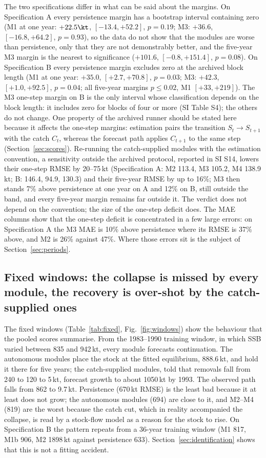 The two specifications differ in what can be said about the margins. On Specification A every persistence margin has a bootstrap interval containing zero (M1 at one year: $+22.5\kt$, $[-13.4, +52.2]$, $p=0.19$; M3: $+36.6$, $[-16.8, +64.2]$, $p=0.93$), so the data do not show that the modules are worse than persistence, only that they are not demonstrably better, and the five-year M3 margin is the nearest to significance ($+101.6$, $[-0.8, +151.4]$, $p=0.08$). On Specification B every persistence margin excludes zero at the archived block length (M1 at one year: $+35.0$, $[+2.7, +70.8]$, $p=0.03$; M3: $+42.3$, $[+1.0, +92.5]$, $p=0.04$; all five-year margins $p\le 0.02$, M1 $[+33, +219]$). The M3 one-step margin on B is the only interval whose classification depends on the block length: it includes zero for blocks of four or more (SI Table S4); the others do not change. One property of the archived runner should be stated here because it affects the one-step margins: estimation pairs the transition $S_t\to S_{t+1}$ with the catch $C_t$, whereas the forecast path applies $C_{t+1}$ to the same step (Section~\ref{sec:scores}). Re-running the catch-supplied modules with the estimation convention, a sensitivity outside the archived protocol, reported in SI S14, lowers their one-step RMSE by 20--75\,kt (Specification A: M2 113.4, M3 105.2, M4 138.9\,kt; B: 146.4, 94.9, 130.3) and their five-year RMSE by up to 16\%; M3 then stands 7\% above persistence at one year on A and 12\% on B, still outside the band, and every five-year margin remains far outside it. The verdict does not depend on the convention; the size of the one-step deficit does. The MAE columns show that the one-step deficit is concentrated in a few large errors: on Specification A the M3 MAE is 10\% above persistence where its RMSE is 37\% above, and M2 is 26\% against 47\%. Where those errors sit is the subject of Section~\ref{sec:periods}.

\FloatBarrier
\subsection{Fixed windows: the collapse is missed by every module, the recovery is over-shot by the catch-supplied ones}\label{sec:fixed}

The fixed windows (Table~\ref{tab:fixed}, Fig.~\ref{fig:windows}) show the behaviour that the pooled scores summarise. From the 1983--1990 training window, in which SSB varied between 835 and 942\,kt, every module forecasts continuation. The autonomous modules place the stock at the fitted equilibrium, 888.6\,kt, and hold it there for five years; the catch-supplied modules, told that removals fall from 240 to 120 to 5\,kt, forecast growth to about 1050\,kt by 1993. The observed path falls from 862 to 9.7\,kt. Persistence (670\,kt RMSE) is the least bad because it at least does not grow; the autonomous modules (694) are close to it, and M2--M4 (819) are the worst because the catch cut, which in reality accompanied the collapse, is read by a stock-flow model as a reason for the stock to rise. On Specification B the pattern repeats from a 36-year training window (M1 817, M1b 906, M2 1898\,kt against persistence 633). Section~\ref{sec:identification} shows that this is not a fitting accident.

